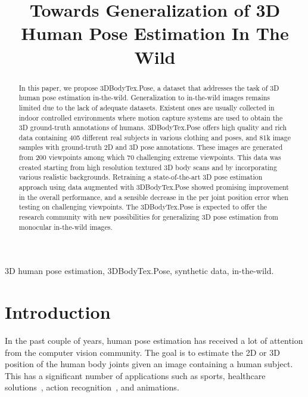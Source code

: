 \documentclass{article}
\title{Towards Generalization of 3D Human Pose Estimation In The Wild}
\begin{document}
\maketitle
\begin{abstract}


In this paper, we propose 3DBodyTex.Pose, a dataset that addresses the task of 3D human pose estimation in-the-wild. Generalization to in-the-wild images remains limited due to the lack of adequate datasets. Existent ones are usually collected in indoor controlled environments where motion capture systems are used to obtain the 3D ground-truth annotations of humans.
3DBodyTex.Pose offers high quality and rich data containing 405 different real subjects in various clothing and poses, and 81k image samples with ground-truth 2D and 3D pose annotations. 
These images are generated from 200 viewpoints among which 70 challenging extreme viewpoints. This data was created starting from high resolution textured 3D body scans and by incorporating various realistic backgrounds.
Retraining a state-of-the-art 3D pose estimation approach using data augmented with 3DBodyTex.Pose showed promising improvement in the overall performance, and a sensible decrease in the per joint position error when testing on challenging viewpoints. The 3DBodyTex.Pose is expected to offer the research community with new possibilities for generalizing 3D pose estimation from monocular in-the-wild images.



\end{abstract}
\begin{keywords}
3D human pose estimation, 3DBodyTex.Pose, synthetic data, in-the-wild. 
\end{keywords}


\vspace{-0.1cm}
\section{Introduction}
\label{sec:intro}
\vspace{-0.1cm}
In the past couple of years, human pose estimation has received a lot of attention from the computer vision community. The goal is to estimate the 2D or 3D position of the human body joints given an image containing a human subject. This has a significant number of applications such as sports, healthcare solutions~\cite{baptista2019home}, action recognition~\cite{baptista2019home,demisse2018pose}, and animations.
\end{document}
